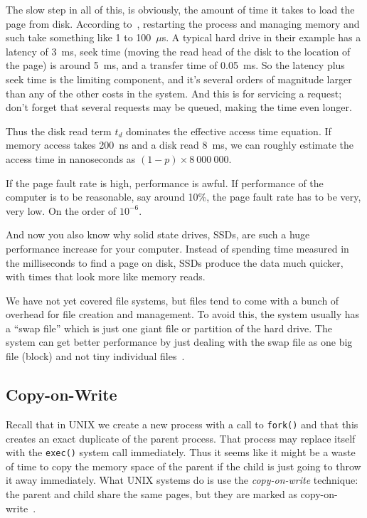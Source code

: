 The slow step in all of this, is obviously, the amount of time it takes to load the page from disk. According to~\cite{osc}, restarting the process and managing memory and such take something like 1 to 100~$\mu$s. A typical hard drive in their example has a latency of 3~ms, seek time (moving the read head of the disk to the location of the page) is around 5~ms, and a transfer time of 0.05~ms. So the latency plus seek time is the limiting component, and it's several orders of magnitude larger than any of the other costs in the system. And this is for servicing a request; don't forget that several requests may be queued, making the time even longer.

Thus the disk read term $t_{d}$ dominates the effective access time equation. If memory access takes 200~ns and a disk read 8~ms, we can roughly estimate the access time in nanoseconds as $(1-p) \times 8~000~000$. 

If the page fault rate is high, performance is awful. If performance of the computer is to be reasonable, say around 10\%, the page fault rate has to be very, very low. On the order of $10^{-6}$. 

And now you also know why solid state drives, SSDs, are such a huge performance increase for your computer. Instead of spending time measured in the milliseconds to find a page on disk, SSDs produce the data much quicker, with times that look more like memory reads.

We have not yet covered file systems, but files tend to come with a bunch of overhead for file creation and management. To avoid this, the system usually has a ``swap file'' which is just one giant file or partition of the hard drive. The system can get better performance by just dealing with the swap file as one big file (block) and not tiny individual files~\cite{osc}.

\subsection*{Copy-on-Write}
Recall that in UNIX we create a new process with a call to \texttt{fork()} and that this creates an exact duplicate of the parent process. That process may replace itself with the \texttt{exec()} system call immediately. Thus it seems like it might be a waste of time to copy the memory space of the parent if the child is just going to throw it away immediately. What UNIX systems do is use the \textit{copy-on-write} technique: the parent and child share the same pages, but they are marked as copy-on-write~\cite{osc}.

